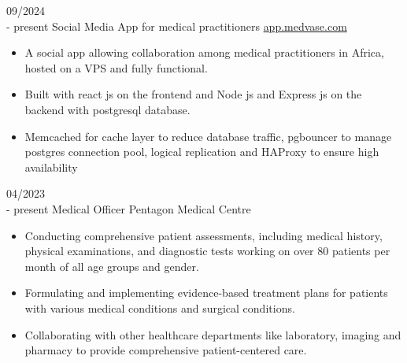 \documentclass[9pt]{developercv} %
\begin{document}
\vspace{-10 pt}
\begin{entrylist}
	\entry
        {09/2024 \\- present}
		{Social Media App for medical practitioners}
		{\href{https://app.medvase.com}{app.medvase.com}}
		{\vspace{-10pt}
        \begin{itemize}[noitemsep,topsep=0pt,parsep=0pt,partopsep=0pt, leftmargin=-1pt]
            \item {A social app allowing collaboration among medical practitioners in Africa, hosted on a VPS and fully functional.}
            \item {Built with react js on the frontend and Node js and Express js on the backend with postgresql database.}
            \item {Memcached for cache layer to reduce database traffic, pgbouncer to manage postgres connection pool, logical replication and HAProxy to ensure high availability}
        \end{itemize} 
        }
	\entry
		{04/2023 \\- present}
		{Medical Officer}
		{Pentagon Medical Centre}
		{\vspace{-10pt}
        \begin{itemize}[noitemsep,topsep=0pt,parsep=0pt,partopsep=0pt, leftmargin=-1pt]
            \item Conducting comprehensive patient assessments, including medical history, physical examinations, and diagnostic tests working on over 80 patients per month of all age groups and gender.
            \item Formulating and implementing evidence-based treatment plans for patients with various medical conditions and surgical conditions.
            \item Collaborating with other healthcare departments like laboratory, imaging and pharmacy to provide comprehensive patient-centered care.
        \end{itemize} 
        }
\end{entrylist}

\vspace{-10 pt}
    \vspace{-6pt}
    
\end{document}
